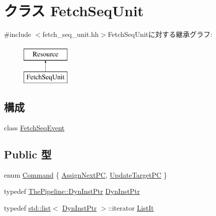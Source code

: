 \hypertarget{classFetchSeqUnit}{
\section{クラス FetchSeqUnit}
\label{classFetchSeqUnit}
}


{\ttfamily \#include $<$fetch\_\-seq\_\-unit.hh$>$}FetchSeqUnitに対する継承グラフ:\begin{figure}[H]
\begin{center}
\leavevmode
\includegraphics[height=2cm]{classFetchSeqUnit}
\end{center}
\end{figure}
\subsection*{構成}
\begin{DoxyCompactItemize}
\item 
class \hyperlink{classFetchSeqUnit_1_1FetchSeqEvent}{FetchSeqEvent}
\end{DoxyCompactItemize}
\subsection*{Public 型}
\begin{DoxyCompactItemize}
\item 
enum \hyperlink{classFetchSeqUnit_a2afce0a47a93eee73a314d53e4890153}{Command} \{ \hyperlink{classFetchSeqUnit_a2afce0a47a93eee73a314d53e4890153a01d26f167ac9e921c263bbcd80dd3bc4}{AssignNextPC}, 
\hyperlink{classFetchSeqUnit_a2afce0a47a93eee73a314d53e4890153abf7b003b9980c66157a424a6142f1c38}{UpdateTargetPC}
 \}
\item 
typedef \hyperlink{classRefCountingPtr}{ThePipeline::DynInstPtr} \hyperlink{classFetchSeqUnit_af9d0c8a46736ba6aa2d8bb94da1a5e73}{DynInstPtr}
\item 
typedef \hyperlink{classstd_1_1list}{std::list}$<$ \hyperlink{classRefCountingPtr}{DynInstPtr} $>$::iterator \hyperlink{classFetchSeqUnit_a184cb829e22cc656acb41864f68f51ea}{ListIt}
\end{DoxyCompactItemize}

